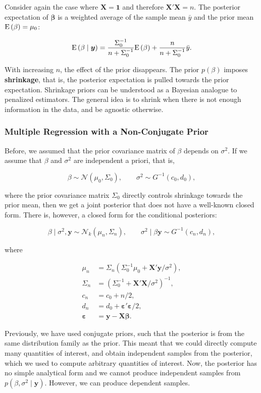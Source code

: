 Consider again the case where $\bm{X} = \bm{1}$ and therefore $\bm{X}'\bm{X} = n$. The posterior expectation of $\bm{\beta}$ is a weighted average of the sample mean $\bar y$ and the prior mean $\mathrm{E}\left({\beta}\right) = \mu_0$:

\[
	\mathrm{E}\left({\beta\mid\bm{y}}\right) = \frac{\Sigma_0^{-1}}{n+\Sigma_0^{-1}}\mathrm{E}\left({\beta}\right)+\frac{n}{n+\Sigma_0^{-1}}\bar y.
\]

With increasing $n$, the effect of the prior disappears. The prior $p(\beta)$ imposes \textbf{shrinkage}, that is, the posterior expectation is pulled towards the prior expectation. Shrinkage priors can be understood as a Bayesian analogue to penalized estimators. The general idea is to shrink when there is not enough information in the data, and be agnostic otherwise.

\subsubsection{Multiple Regression with a Non-Conjugate Prior}

Before, we assumed that the prior covariance matrix of $\beta$ depends on $\sigma^2$. If we assume that $\beta$ and $\sigma^2$ are independent a priori, that is,

\[
	\beta\sim\mathcal{N}(\mu_0,\Sigma_0),\qquad\sigma^2\sim G^{-1}(c_0,d_0),
\]

where the prior covariance matrix $\Sigma_0$ directly controls shrinkage towards the prior mean, then we get a joint posterior that does not have a well-known closed form. There is, however, a closed form for the conditional posteriors:

\[
	\beta\mid\sigma^2,\bm{y}\sim\mathcal{N}_k(\mu_n,\Sigma_n),\qquad \sigma^2\mid\beta\bm{y}\sim G^{-1}(c_n,d_n),
\]

where 

\begin{align*}
	\mu_n &= \Sigma_n(\Sigma_0^{-1}\mu_0+ \bm{X}'\bm{y}/\sigma^2), \\
	\Sigma_n &= (\Sigma_0^{-1}+\bm{X}'\bm{X}/\sigma^2)^{-1}, \\
	c_n &= c_0 + n/2, \\
	d_n &= d_0 + \bm{\varepsilon}'\bm{\varepsilon}/2, \\
	\bm{\varepsilon} &= \bm{y}-\bm{X\beta}.
\end{align*}

Previously, we have used conjugate priors, such that the posterior is from the same distribution family as the prior. This meant that we could directly compute many quantities of interest, and obtain independent samples from the posterior, which we used to compute arbitrary quantities of interest. Now, the posterior has no simple analytical form and
we cannot produce independent samples from $p(\beta,\sigma^2\mid\bm{y})$. However, we can produce dependent samples.


